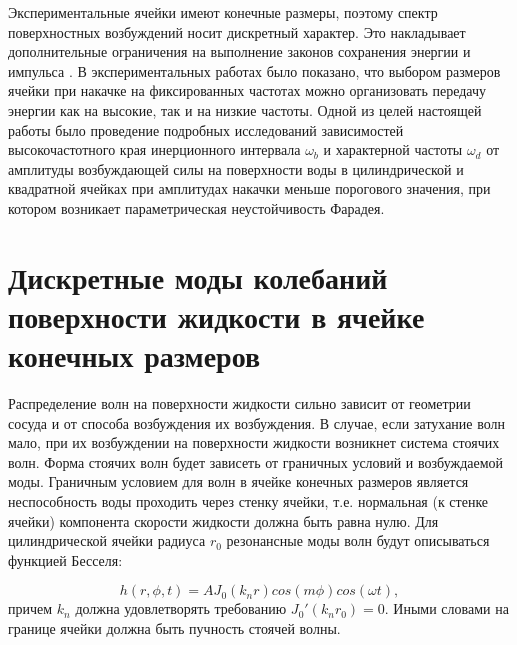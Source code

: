 
Экспериментальные ячейки имеют конечные размеры, поэтому спектр поверхностных возбуждений носит дискретный характер. Это накладывает дополнительные ограничения на выполнение законов сохранения энергии и импульса \cite{Kartashova1991}. В экспериментальных работах \cite{Brazhnikov2014, Aburakhimov2015} было показано, что выбором размеров ячейки при накачке на фиксированных частотах можно организовать передачу энергии как на высокие, так и на низкие частоты.
Одной из целей настоящей работы было проведение подробных исследований зависимостей высокочастотного края инерционного интервала $\omega_b$ и характерной частоты $\omega_d$ от амплитуды возбуждающей силы на поверхности воды в цилиндрической и квадратной ячейках при амплитудах накачки меньше порогового значения, при котором возникает параметрическая неустойчивость Фарадея.

\section{Дискретные моды колебаний поверхности жидкости  в ячейке конечных размеров} %

Распределение волн на поверхности жидкости сильно зависит от геометрии сосуда и от способа возбуждения их возбуждения.
В случае, если затухание волн мало, при их возбуждении на поверхности жидкости возникнет система стоячих волн. Форма стоячих волн будет зависеть от граничных условий и возбуждаемой моды. Граничным условием для волн в ячейке конечных размеров  является неспособность воды проходить через стенку ячейки, т.е. нормальная (к стенке ячейки) компонента скорости жидкости должна быть равна нулю. Для цилиндрической ячейки радиуса $r_0$ резонансные моды волн будут описываться функцией Бесселя:

\begin{equation}
 \label{eq:Bessel}
h(r, \phi, t) = A J_0(k_nr) cos(m\phi) cos(\omega t),
\end{equation}
причем $k_n$ должна удовлетворять требованию ${J_0}'(k_nr_0) = 0$. Иными словами на границе ячейки должна быть пучность стоячей волны.

